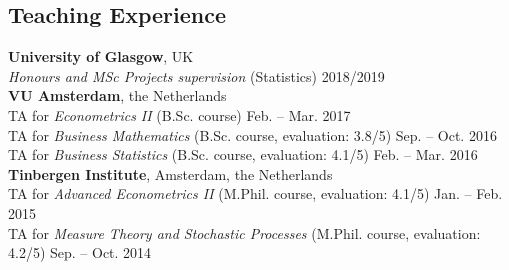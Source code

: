 \documentclass[margin,line]{resume}
\begin{document}
\begin{resume}
 
 \section{\mysidestyle Teaching Experience}
    \textbf{University of Glasgow}, UK\\ 
    \textit{Honours and MSc Projects supervision} (Statistics)  \hfill 2018/2019 \vspace{2mm}\\  	
    \textbf{VU Amsterdam}, the Netherlands \\ 
    TA for \textit{Econometrics II} (B.Sc. course)  \hfill Feb. -- Mar. 2017\\  	
    TA for \textit{Business Mathematics} (B.Sc. course, evaluation: 3.8/5)  \hfill Sep. -- Oct. 2016\\ 
    TA for \textit{Business Statistics} (B.Sc. course, evaluation: 4.1/5)  \hfill Feb. -- Mar. 2016\vspace{2mm}\\
   	\textbf{Tinbergen Institute}, Amsterdam, the Netherlands \\
    TA for \textit{Advanced Econometrics II} (M.Phil. course, evaluation: 4.1/5) \hfill Jan. -- Feb. 2015\\      
	TA for \textit{Measure Theory and Stochastic Processes} (M.Phil. course, evaluation: 4.2/5) \hfill Sep. -- Oct. 2014\\

 
\newpage	        
  

\end{resume}
\end{document}
